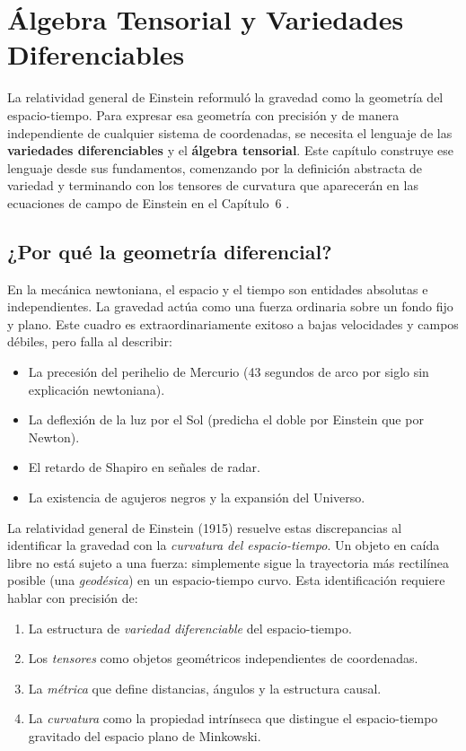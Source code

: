 \chapter{Álgebra Tensorial y Variedades Diferenciables}
\label{cap:algebra}

La relatividad general de Einstein reformuló la gravedad como la geometría del espacio-tiempo. Para expresar esa geometría con precisión y de manera independiente de cualquier sistema de coordenadas, se necesita el lenguaje de las \textbf{variedades diferenciables} y el \textbf{álgebra tensorial}. Este capítulo construye ese lenguaje desde sus fundamentos, comenzando por la definición abstracta de variedad y terminando con los tensores de curvatura que aparecerán en las ecuaciones de campo de Einstein en el Capítulo~6 \cite{Carroll2004,Wald1984,Misner1973}.

\section{¿Por qué la geometría diferencial?}

En la mecánica newtoniana, el espacio y el tiempo son entidades absolutas e independientes. La gravedad actúa como una fuerza ordinaria sobre un fondo fijo y plano. Este cuadro es extraordinariamente exitoso a bajas velocidades y campos débiles, pero falla al describir:

\begin{itemize}
  \item La precesión del perihelio de Mercurio (43 segundos de arco por siglo sin explicación newtoniana).
  \item La deflexión de la luz por el Sol (predicha el doble por Einstein que por Newton).
  \item El retardo de Shapiro en señales de radar.
  \item La existencia de agujeros negros y la expansión del Universo.
\end{itemize}

La relatividad general de Einstein (1915) resuelve estas discrepancias al identificar la gravedad con la \emph{curvatura del espacio-tiempo}. Un objeto en caída libre no está sujeto a una fuerza: simplemente sigue la trayectoria más rectilínea posible (una \emph{geodésica}) en un espacio-tiempo curvo. Esta identificación requiere hablar con precisión de:

\begin{enumerate}[leftmargin=2em, label=\textbf{\arabic*.}]
  \item La estructura de \emph{variedad diferenciable} del espacio-tiempo.
  \item Los \emph{tensores} como objetos geométricos independientes de coordenadas.
  \item La \emph{métrica} que define distancias, ángulos y la estructura causal.
  \item La \emph{curvatura} como la propiedad intrínseca que distingue el espacio-tiempo gravitado del espacio plano de Minkowski.
\end{enumerate}

